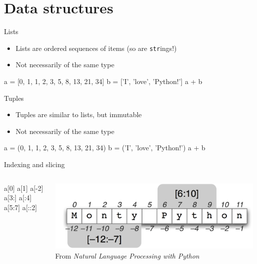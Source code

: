 \section{Data structures}

\begin{frame}[fragile]{Lists}
    \begin{itemize}
        \item Lists are \alert{ordered sequences} of items
              (so are \texttt{str}ings!)
        \item Not necessarily of the same type
    \end{itemize}
    \vfill
    \begin{py3}
        a = [0, 1, 1, 2, 3, 5, 8, 13, 21, 34]
        b = ['I', 'love', 'Python!']
        a + b
    \end{py3}
\end{frame}

\begin{frame}[fragile]{Tuples}
    \begin{itemize}
        \item Tuples are similar to lists, but \alert{immutable}
        \item Not necessarily of the same type
    \end{itemize}
    \vfill
    \begin{py3}
        a = (0, 1, 1, 2, 3, 5, 8, 13, 21, 34)
        b = ('I', 'love', 'Python!')
        a + b
    \end{py3}
\end{frame}

\begin{frame}[fragile]{Indexing and slicing}
    \begin{columns}
        \begin{column}{0.2\textwidth}
            \begin{py3}
                a[0]
                a[1]
                a[-2]
                a[3:]
                a[:4]
                a[5:7]
                a[::2]
            \end{py3}
        \end{column}
        \begin{column}{0.8\textwidth}
            \begin{center}
                \includegraphics[width=\textwidth]{figures/py_str} \\
                {\scriptsize%
                 From \textit{Natural Language Processing with Python}}
            \end{center}
        \end{column}
    \end{columns}
\end{frame}

